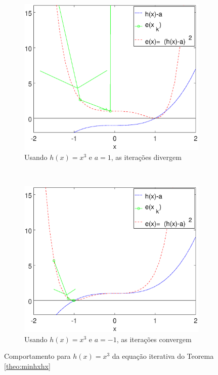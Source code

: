 \begin{figure}[!h]
    \centering
    \begin{subfigure}[b]{0.45\textwidth}
        \includegraphics[width=\textwidth]{chapters/minimization-hx/mfiles/hx3_a/minimizando_hx_a_1.eps}
        \caption{Usando $h(x)=x^3$ e $a=1$, as iterações divergem}
        \label{fig:hxacases3a}
    \end{subfigure}
    ~ %
    \begin{subfigure}[b]{0.45\textwidth}
        \includegraphics[width=\textwidth]{chapters/minimization-hx/mfiles/hx3_a/minimizando_hx_a_2.eps}
        \caption{Usando $h(x)=x^3$ e $a=-1$, as iterações convergem}
        \label{fig:hxacases3b}
    \end{subfigure}
    \caption{Comportamento para $h(x)=x^3$ da equação iterativa do Teorema \ref{theo:minhxhx}}
    \label{fig:hxacases3}
\end{figure}

